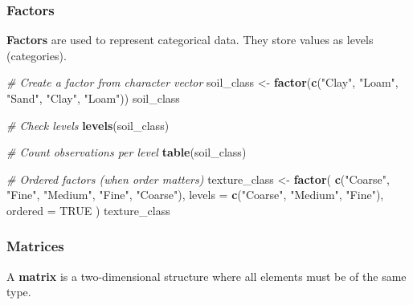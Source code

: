 \documentclass[
  10pt,
  b5paper,
  oneside]{book}
\newenvironment{Shaded}{\begin{snugshade}}{\end{snugshade}}
\newcommand{\AttributeTok}[1]{\textcolor[rgb]{0.13,0.29,0.53}{#1}}
\newcommand{\CommentTok}[1]{\textcolor[rgb]{0.56,0.35,0.01}{\textit{#1}}}
\newcommand{\ConstantTok}[1]{\textcolor[rgb]{0.56,0.35,0.01}{#1}}
\newcommand{\FunctionTok}[1]{\textcolor[rgb]{0.13,0.29,0.53}{\textbf{#1}}}
\newcommand{\NormalTok}[1]{#1}
\newcommand{\OtherTok}[1]{\textcolor[rgb]{0.56,0.35,0.01}{#1}}
\newcommand{\StringTok}[1]{\textcolor[rgb]{0.31,0.60,0.02}{#1}}
\begin{document}
\subsubsection{Factors}\label{factor-data}

\textbf{Factors} are used to represent categorical data.
They store values as levels (categories).

\begin{Shaded}
\begin{Highlighting}[]
\CommentTok{\# Create a factor from character vector}
\NormalTok{soil\_class }\OtherTok{\textless{}{-}} \FunctionTok{factor}\NormalTok{(}\FunctionTok{c}\NormalTok{(}\StringTok{"Clay"}\NormalTok{, }\StringTok{"Loam"}\NormalTok{, }\StringTok{"Sand"}\NormalTok{, }\StringTok{"Clay"}\NormalTok{, }\StringTok{"Loam"}\NormalTok{))}
\NormalTok{soil\_class}

\CommentTok{\# Check levels}
\FunctionTok{levels}\NormalTok{(soil\_class)}

\CommentTok{\# Count observations per level}
\FunctionTok{table}\NormalTok{(soil\_class)}

\CommentTok{\# Ordered factors (when order matters)}
\NormalTok{texture\_class }\OtherTok{\textless{}{-}} \FunctionTok{factor}\NormalTok{(}
  \FunctionTok{c}\NormalTok{(}\StringTok{"Coarse"}\NormalTok{, }\StringTok{"Fine"}\NormalTok{, }\StringTok{"Medium"}\NormalTok{, }\StringTok{"Fine"}\NormalTok{, }\StringTok{"Coarse"}\NormalTok{),}
  \AttributeTok{levels =} \FunctionTok{c}\NormalTok{(}\StringTok{"Coarse"}\NormalTok{, }\StringTok{"Medium"}\NormalTok{, }\StringTok{"Fine"}\NormalTok{),}
  \AttributeTok{ordered =} \ConstantTok{TRUE}
\NormalTok{)}
\NormalTok{texture\_class}
\end{Highlighting}
\end{Shaded}

\subsubsection{Matrices}\label{matrix-data}

A \textbf{matrix} is a two-dimensional structure where all elements must be of the same type.
\end{document}
